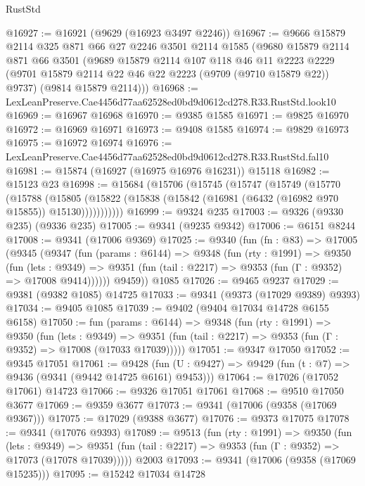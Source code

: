 \begin{lexlean}{RustStd}
\begin{coremodule}
@16927 := @16921 (@9629 (@16923 @3497 @2246))
@16967 := @9666
    @15879
    @2114
    @325
    @871
    @66
    @27
    @2246
    @3501
    @2114
    @1585
    (@9680
      @15879
      @2114
      @871
      @66
      @3501
      (@9689
        @15879
        @2114
        @107
        @118
        @46
        @11
        @2223
        @2229
        (@9701 @15879 @2114 @22 @46 @22 @2223 (@9709 (@9710 @15879 @22)) @9737)
        (@9814 @15879 @2114)))
@16968 := LexLeanPreserve.Cae4456d77aa62528ed0bd9d0612cd278.R33.RustStd.look10
@16969 := @16967 @16968
@16970 := @9385 @1585
@16971 := @9825 @16970
@16972 := @16969 @16971
@16973 := @9408 @1585
@16974 := @9829 @16973
@16975 := @16972 @16974
@16976 := LexLeanPreserve.Cae4456d77aa62528ed0bd9d0612cd278.R33.RustStd.fal10
@16981 := @15874 (@16927 (@16975 @16976 @16231)) @15118
@16982 := @15123 @23
@16998 := @15684
    (@15706
      (@15745
        (@15747
          (@15749
            (@15770
              (@15788
                (@15805
                  (@15822 (@15838 (@15842 (@16981 (@6432 (@16982 @970 @15855)) @15130)))))))))))
@16999 := @9324 @235
@17003 := @9326 (@9330 @235) (@9336 @235)
@17005 := @9341 (@9235 @9342)
@17006 := @6151 @8244
@17008 := @9341 (@17006 @9369)
@17025 := @9340
    (fun (fn : @83) =>
    @17005
      (@9345
        (@9347
          (fun (params : @6144) =>
          @9348
            (fun (rty : @1991) =>
            @9350
              (fun (lets : @9349) =>
              @9351 (fun (tail : @2217) => @9353 (fun (Γ : @9352) => @17008 @9414))))))
        @9459))
    @1085
@17026 := @9465 @9237
@17029 := @9381 (@9382 @1085) @14725
@17033 := @9341 (@9373 (@17029 @9389) @9393)
@17034 := @9405 @1085
@17039 := @9402 (@9404 @17034 @14728 @6155 @6158)
@17050 := fun (params : @6144) =>
  @9348
    (fun (rty : @1991) =>
    @9350
      (fun (lets : @9349) =>
      @9351 (fun (tail : @2217) => @9353 (fun (Γ : @9352) => @17008 (@17033 @17039)))))
@17051 := @9347 @17050
@17052 := @9345 @17051
@17061 := @9428
    (fun (U : @9427) => @9429 (fun (t : @7) => @9436 (@9341 (@9442 @14725 @6161) @9453)))
@17064 := @17026 (@17052 @17061) @14723
@17066 := @9326 @17051 @17061
@17068 := @9510 @17050 @3677
@17069 := @9359 @3677
@17073 := @9341 (@17006 (@9358 (@17069 @9367)))
@17075 := @17029 (@9388 @3677)
@17076 := @9373 @17075
@17078 := @9341 (@17076 @9393)
@17089 := @9513
    (fun (rty : @1991) =>
    @9350
      (fun (lets : @9349) =>
      @9351 (fun (tail : @2217) => @9353 (fun (Γ : @9352) => @17073 (@17078 @17039)))))
    @2003
@17093 := @9341 (@17006 (@9358 (@17069 @15235)))
@17095 := @15242 @17034 @14728

\end{coremodule}
\end{lexlean}
